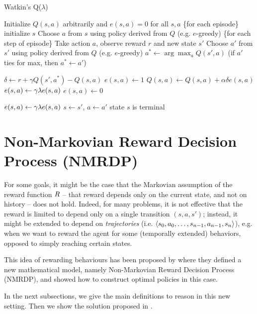 \begin{algorithm}
	\caption{Watkin's Q($\lambda$) \citep{watkins1989learning}}
	\label{alg:q-learning-lambda}
	\begin{algorithmic}[1]
		\State Initialize $Q(s, a)$ arbitrarily and $e(s, a)=0$ for all $s, a$
		\Repeat \{for each episode\} 
			\State initialize $s$
			\State Choose $a$ from $s$ using  policy derived from $Q$ (e.g. $e$-greedy)
			\Repeat \{for each step of episode\}	
				\State Take action $a$, observe reward $r$ and new state $s'$
				\State Choose $a'$ from $s'$ using policy derived from $Q$ (e.g. $e$-greedy)
				\State $a^* \gets \arg\max_a Q(s', a)$ (if $a'$ ties for max, then $a^* \gets a'$)
				
				\State $\delta \gets r + \gamma Q(s', a^*) - Q(s, a)$
				\State $e(s, a) \gets 1$ \label{q-learning-lambda-replacing-traces}
					\State $Q(s, a) \gets Q(s, a) + \alpha\delta e(s, a)$
						\State $e(s, a) \gets \gamma\lambda e(s, a)$
					\Else 
						\State $e(s, a) \gets 0$
					\EndIf
					
					\State $e(s, a) \gets \gamma\lambda e(s, a)$
				\EndFor
				\State $s\gets s'$, $a \gets a'$
			\Until state $s$ is terminal
		\Until
	\end{algorithmic}
	
\end{algorithm}

\section{Non-Markovian Reward Decision Process (NMRDP)}\label{sect:NMRDP}
For some goals, it might be the case that the Markovian assumption of the reward function $R$ -- that reward depends only on the current state, and not on history -- does not hold. Indeed, for many problems, it is not effective that the reward is limited to depend only on a single transition $(s,a,s')$; instead, it might be extended to depend on \emph{trajectories} (i.e. $\langle s_0, a_0, \dots, s_{n-1}, a_{n-1}, s_n \rangle$), e.g. when we want to reward the agent for some (temporally  extended) behaviors, opposed to simply reaching certain states. 

This idea of rewarding behaviours has been proposed by \citep{bacchus1996rewarding} where they defined a new mathematical model, namely Non-Markovian Reward Decision Process (NMRDP), and showed how to construct optimal policies in this case.

In the next subsections, we give the main definitions to reason in this new setting. Then we show the solution proposed in \citep{bacchus1996rewarding}.

